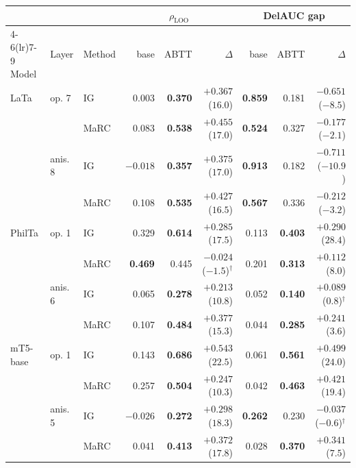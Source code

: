 \begin{table}[t]
\centering
\small
\setlength{\tabcolsep}{5pt}
\begin{tabular}{lllrrrrrr}
\toprule
& & & \multicolumn{3}{c}{$\rho_{\text{LOO}}$} & \multicolumn{3}{c}{DelAUC gap} \\
\cmidrule(lr){4-6}\cmidrule(lr){7-9}
Model & Layer & Method & base & ABTT & $\Delta$ & base & ABTT & $\Delta$ \\
\midrule
LaTa & op. 7 & IG & 0.003 & \textbf{0.370} & $+0.367$ ($16.0$) & \textbf{0.859} & 0.181 & $-0.651$ ($-8.5$) \\
 &  & MaRC & 0.083 & \textbf{0.538} & $+0.455$ ($17.0$) & \textbf{0.524} & 0.327 & $-0.177$ ($-2.1$) \\
 & anis. 8 & IG & $-0.018$ & \textbf{0.357} & $+0.375$ ($17.0$) & \textbf{0.913} & 0.182 & $-0.711$ ($-10.9$) \\
 &  & MaRC & 0.108 & \textbf{0.535} & $+0.427$ ($16.5$) & \textbf{0.567} & 0.336 & $-0.212$ ($-3.2$) \\
\addlinespace[3pt]
PhilTa & op. 1 & IG & 0.329 & \textbf{0.614} & $+0.285$ ($17.5$) & 0.113 & \textbf{0.403} & $+0.290$ ($28.4$) \\
 &  & MaRC & \textbf{0.469} & 0.445 & $-0.024$ ($-1.5$)$^\dagger$ & 0.201 & \textbf{0.313} & $+0.112$ ($8.0$) \\
 & anis. 6 & IG & 0.065 & \textbf{0.278} & $+0.213$ ($10.8$) & 0.052 & \textbf{0.140} & $+0.089$ ($0.8$)$^\dagger$ \\
 &  & MaRC & 0.107 & \textbf{0.484} & $+0.377$ ($15.3$) & 0.044 & \textbf{0.285} & $+0.241$ ($3.6$) \\
\addlinespace[3pt]
mT5-base & op. 1 & IG & 0.143 & \textbf{0.686} & $+0.543$ ($22.5$) & 0.061 & \textbf{0.561} & $+0.499$ ($24.0$) \\
 &  & MaRC & 0.257 & \textbf{0.504} & $+0.247$ ($10.3$) & 0.042 & \textbf{0.463} & $+0.421$ ($19.4$) \\
 & anis. 5 & IG & $-0.026$ & \textbf{0.272} & $+0.298$ ($18.3$) & \textbf{0.262} & 0.230 & $-0.037$ ($-0.6$)$^\dagger$ \\
 &  & MaRC & 0.041 & \textbf{0.413} & $+0.372$ ($17.8$) & 0.028 & \textbf{0.370} & $+0.341$ ($7.5$) \\

\end{tabular}
\end{table}
